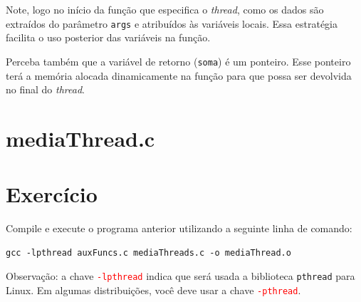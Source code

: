Note, logo no início da função que especifica o \textit{thread}, como os dados são extraídos do parâmetro \texttt{args} e atribuídos às variáveis locais. Essa estratégia facilita o uso posterior das variáveis na função.

Perceba também que a variável de retorno (\texttt{soma}) é um ponteiro. Esse ponteiro terá a memória alocada dinamicamente na função para que possa ser devolvida no final do \textit{thread}. 

\section*{mediaThread.c}


\section{Exercício}
Compile e execute o programa anterior utilizando a seguinte linha de comando:

\begin{lstlisting}[style=MyBashStyle]
gcc -lpthread auxFuncs.c mediaThreads.c -o mediaThread.o
\end{lstlisting}

\textcolor{orange}{\faExclamationTriangle} Observação: a chave \textcolor{red}{\texttt{-lpthread}} indica que será usada a biblioteca \texttt{pthread} para Linux. Em algumas distribuições, você deve usar a chave \textcolor{red}{\texttt{-pthread}}.
